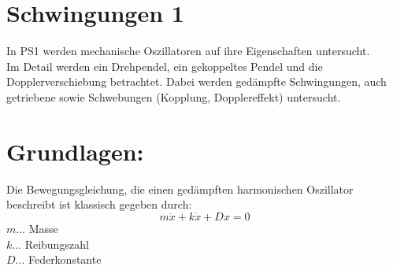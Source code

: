 \documentclass[12pt,a4paper]{article}
\begin{document}
\begin{multicols}{2}




%			




\section{Schwingungen 1}
In PS1 werden mechanische Oszillatoren auf ihre Eigenschaften untersucht.\\
Im Detail werden ein Drehpendel, ein gekoppeltes Pendel und die Dopplerverschiebung betrachtet. Dabei werden gedämpfte Schwingungen, auch getriebene sowie Schwebungen (Kopplung, Dopplereffekt) untersucht.
\section{Grundlagen:}
Die Bewegungsgleichung, die einen gedämpften harmonischen Oszillator beschreibt ist klassisch gegeben durch:
$$m  \ddot{x} + k \dot{x} + D x = 0$$
$m$... Masse\\
$k$... Reibungszahl\\
$D$... Federkonstante\\


\end{multicols}
\end{document}
